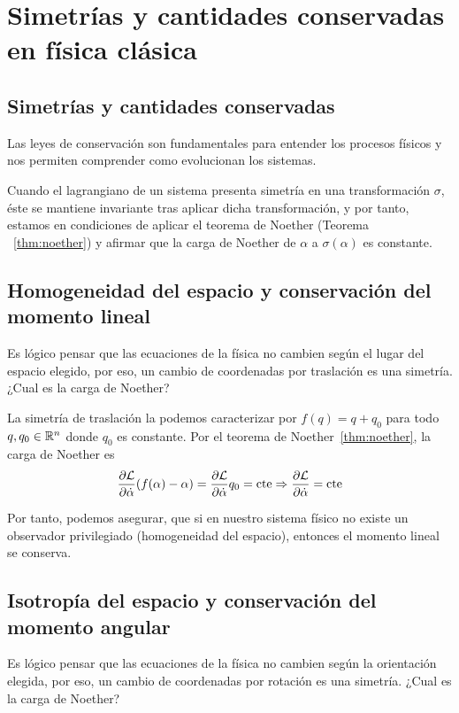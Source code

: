 \section{Simetrías y cantidades conservadas en física clásica}\label{ch:simetrias-y-cantidades-conservadas-en-fisica-clasica}

\subsection{Simetrías y cantidades conservadas}\label{sec:simetrias-y-cantidades-conservadas}

Las leyes de conservación son fundamentales para entender los procesos físicos y nos permiten comprender como evolucionan los sistemas.

Cuando el lagrangiano de un sistema presenta simetría en una transformación $\sigma$, éste se mantiene invariante tras aplicar dicha transformación, y por tanto, estamos en condiciones de aplicar el teorema de Noether (Teorema ~\eqref{thm:noether}) y afirmar que la carga de Noether de $\alpha$ a $\sigma(\alpha)$ es constante.

\subsection{Homogeneidad del espacio y conservación del momento lineal}\label{sec:homogeneidad-del-espacio-y-conservacion-del-momento-lineal}
Es lógico pensar que las ecuaciones de la física no cambien según el lugar del espacio elegido, por eso, un cambio de coordenadas por traslación es una simetría.
¿Cual es la carga de Noether?

La simetría de traslación la podemos caracterizar por $f(q)=q+q_0$ para todo $q, q_0\in\mathbb{R}^n$ donde $q_0$ es constante.
Por el teorema de Noether~\eqref{thm:noether}, la carga de Noether es
\begin{equation}
	\label{eq:conservacion_momento_lineal}
	\frac{\partial \mathcal{L}}{\partial\dot{\alpha}}(f(\alpha)-\alpha) = \frac{\partial \mathcal{L}}{\partial\dot{\alpha}}q_0=\text{cte}\Rightarrow\frac{\partial \mathcal{L}}{\partial\dot{\alpha}}=\text{cte}
\end{equation}

Por tanto, podemos asegurar, que si en nuestro sistema físico no existe un observador privilegiado (homogeneidad del espacio), entonces el momento lineal se conserva.

\subsection{Isotropía del espacio y conservación del momento angular}\label{sec:isotropia-del-espacio-y-conservacion-del-momento-angular}
Es lógico pensar que las ecuaciones de la física no cambien según la orientación elegida, por eso, un cambio de coordenadas por rotación es una simetría.
¿Cual es la carga de Noether?

